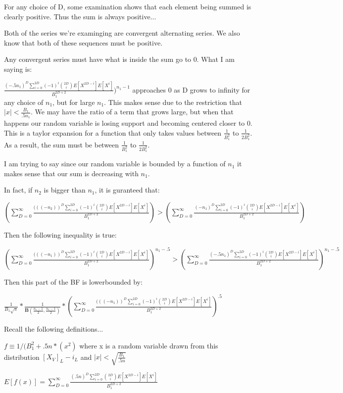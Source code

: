 \documentclass[11pt]{article}
\begin{document}
For any choice of D, some examination shows that each element being summed is clearly positive. Thus the sum is always positive...

Both of the series we're examinging are convergent alternating series. We also know that both of these sequences must be positive. 

Any convergent series must have what is inside the sum go to 0. What I am saying is:

$\frac{(-.5n_1)^D \sum_{i=0}^{2D} (-1)^i \binom{2D}{i}E[X^{2D-i}]E[X^{i}]}{B_1^{2D+2}})^{n_1- 1} $ approaches 0 as D grows to infinity for any choice of $n_1$, but for large $n_1$. This makes sense due to the restriction that $|x| < \frac{B_1}{.5n_1} $. We may have the ratio of a term that grows large, but when that happens our random variable is losing support and becoming centered closer to 0. This is a taylor expansion for a function that only takes values between $\frac{1}{B_1^2}$ to $\frac{1}{2B_1^2}$. As a result, the sum must be between $\frac{1}{B_1^2}$ to $\frac{1}{2B_1^2}$. 

I am trying to say since our random variable is bounded by a function of $n_1$ it makes sense that our sum is decreasing with $n_1$.

In fact, if $n_2$ is bigger than $n_1$, it is guranteed that:

$(\sum_{D=0}^\infty \frac{(((-n_2))^D \sum_{i=0}^{2D} (-1)^i \binom{2D}{i}E[X^{2D-i}]E[X^{i}]}{B_1^{2D+2}}) > (\sum_{D=0}^\infty \frac{(-n_1)^D \sum_{i=0}^{2D} (-1)^i \binom{2D}{i}E[X^{2D-i}]E[X^{i}]}{B_1^{2D+2}}) $

Then the following inequality is true:

$(\sum_{D=0}^\infty \frac{(((-n_1))^D \sum_{i=0}^{2D} (-1)^i \binom{2D}{i}E[X^{2D-i}]E[X^{i}]}{B_1^{2D+2}})^{n_1- .5} > (\sum_{D=0}^\infty \frac{(-.5n_1)^D \sum_{i=0}^{2D} (-1)^i \binom{2D}{i}E[X^{2D-i}]E[X^{i}]}{B_1^{2D+2}})^{n_1- .5} $

Then this part of the BF is lowerbounded by:

$\frac{1}{B_1 \sqrt{\pi}} * \frac{1}{ \mathbf{B}(\frac{n_1 -1}{2}, \frac{n_1 -1}{2})} * (\sum_{D=0}^\infty \frac{(((-n_1))^D \sum_{i=0}^{2D} (-1)^i \binom{2D}{i}E[X^{2D-i}]E[X^{i}]}{B_1^{2D+2}})^{.5} $

Recall the following definitions...

$f \equiv 1 / (B_1^2 + .5n*(x^2)$ where x is a random variable drawn from this distribution $[X_V]_{L} - i_L$ and $|x| < \sqrt{\frac{B_1}{.5n}}$  

$E[f(x)] = \sum_{D=0}^\infty \frac{(.5n)^D \sum_{i=0}^{2D} \binom{2D}{i}E[X^{2D-i}]E[X^{i}]}{B_1^{2D+2}}$
\end{document}
